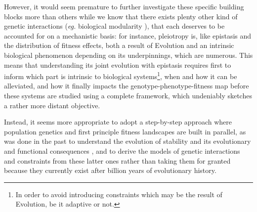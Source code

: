However, it would seem premature to further investigate these specific building blocks more than others while we know that there exists plenty other kind of genetic interactions (\textit{eg.} biological modularity \citep{Wagner96}), that each deserves to be accounted for on a mechanistic basis: for instance, pleiotropy is, like epistasis and the distribution of fitness effects, both a result of Evolution and an intrinsic biological phenomenon \citep{Wagner96,Chesmore16} depending on its underpinnings, which are numerous. This means that understanding its joint evolution with epistasis requires first to inform which part is intrinsic to biological systems\footnote{In order to avoid introducing constraints which may be the result of Evolution, be it adaptive or not.}, when and how it can be alleviated, and how it finally impacts the genotype-phenotype-fitness map before these systems are studied using a complete framework, which undeniably sketches a rather more distant objective.%

Instead, it seems more appropriate to adopt a step-by-step approach where population genetics and first principle fitness landscapes are built in parallel, as was done in the past to understand the evolution of stability \citep{Taverna02,Bloom04} and its evolutionary \citep{Drummond05,Bloom06,Drummond08,Tokuriki09,Serohijos12,Dasmeh14,Echave17a} and functional consequences \citep{Bloom07,Geiler-Samerotte11,Dasmeh18}, and to derive the models of genetic interactions and constraints from these latter ones rather than taking them for granted because they currently exist after billion years of evolutionary history.%


